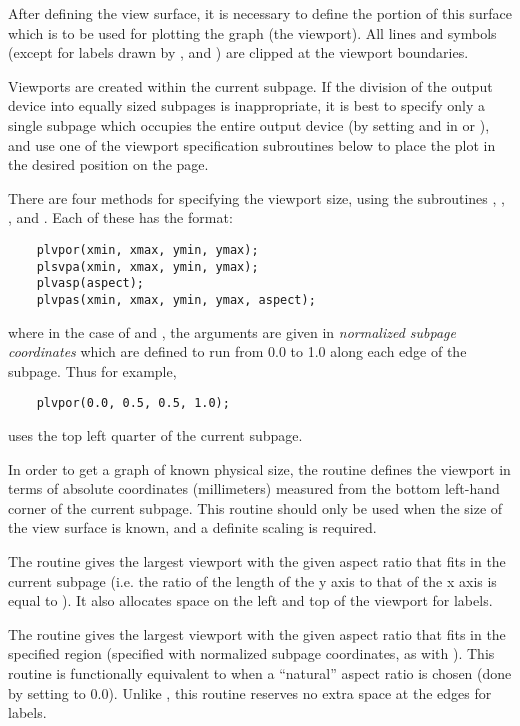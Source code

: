 After defining the view surface, it is necessary to define the portion
of this surface which is to be used for plotting the graph (the
viewport).  All lines and symbols (except for labels drawn by
,  and ) are clipped at the
viewport boundaries.

Viewports are created within the current subpage.  If the division of
the output device into equally sized subpages is inappropriate, it is
best to specify only a single subpage which occupies the entire output
device (by setting  and  in  or
), and use one of the viewport specification subroutines
below to place the plot in the desired position on the page.

There are four methods for specifying the viewport size, using the
subroutines , , , and .
Each of these has the format:

\begin{verbatim}
    plvpor(xmin, xmax, ymin, ymax);
    plsvpa(xmin, xmax, ymin, ymax);
    plvasp(aspect);
    plvpas(xmin, xmax, ymin, ymax, aspect);
\end{verbatim}

where in the case of  and , the arguments are given
in \emph{normalized subpage coordinates} which are defined to run from 0.0
to 1.0 along each edge of the subpage.  Thus for example,

\begin{verbatim}
    plvpor(0.0, 0.5, 0.5, 1.0);
\end{verbatim}

uses the top left quarter of the current subpage.

In order to get a graph of known physical size, the routine 
defines the viewport in terms of absolute coordinates (millimeters) measured
from the bottom left-hand corner of the current subpage.  This routine
should only be used when the size of the view surface is known, and a
definite scaling is required.

The routine  gives the largest viewport with the given aspect
ratio that fits in the current subpage (i.e. the ratio of the length of the
y axis to that of the x axis is equal to ).  It also allocates
space on the left and top of the viewport for labels.

The routine  gives the largest viewport with the given aspect
ratio that fits in the specified region (specified with normalized subpage
coordinates, as with ).  This routine is functionally
equivalent to  when a ``natural'' aspect ratio is chosen (done
by setting  to 0.0).  Unlike , this routine
reserves no extra space at the edges for labels.

